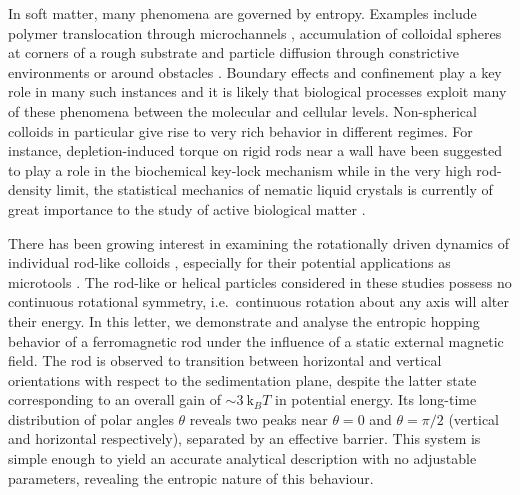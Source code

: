 \documentclass[aps,prl,twocolumn,superscriptaddress]{revtex4-1}
\newcommand{\kk}{\mathrm{k}_B}
\begin{document}
\pacs{}

\maketitle

%
%
%
%
%
%
%
In soft matter, many phenomena are governed by entropy. Examples include polymer translocation through microchannels \cite{Muthukumar1989,Ledesma-Aguilar2012}, accumulation of colloidal spheres at corners of a rough substrate \cite{Dinsmore1996} and particle diffusion through constrictive environments or around obstacles \cite{Chou1999,Zwanzig1992}. Boundary effects and confinement play a key role in many such instances and it is likely that biological processes exploit many of these phenomena between the molecular and cellular levels. Non-spherical colloids in particular give rise to very rich behavior in different regimes. For instance, depletion-induced torque on rigid rods near a wall have been suggested to play a role in the biochemical key-lock mechanism \cite{Roth2002,Helden2003} while in the very high rod-density limit, the statistical mechanics of nematic liquid crystals is currently of great importance to the study of active biological matter \cite{Baskaran2009,Marchetti2013}.

There has been growing interest in examining the rotationally driven dynamics of individual rod-like colloids \cite{Dhar2007,Shelton2005,Ghosh2012}, especially for their potential applications as microtools \cite{Solovev2012,Xi2013}. The rod-like or helical particles considered in these studies possess no continuous rotational symmetry, i.e.\ continuous rotation about any axis will alter their energy. In this letter, we demonstrate and analyse the entropic hopping behavior of a ferromagnetic rod under the influence of a static external magnetic field. The rod is observed to transition between horizontal and vertical orientations with respect to the sedimentation plane, despite the latter state corresponding to an overall gain of $\sim3\ \kk T$ in potential energy. Its long-time distribution of polar angles $\theta$ reveals two peaks near $\theta=0$ and $\theta=\pi/2$ (vertical and horizontal respectively), separated by an effective barrier. This system is simple enough to yield an accurate analytical description with no adjustable parameters, revealing the entropic nature of this behaviour. 
\end{document}
